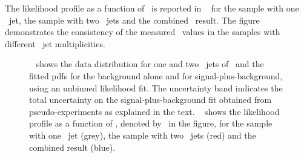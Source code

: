 The likelihood profile as a function of \mt\ is reported in \fig~ for the sample with one \btagged\ jet, the sample with two \btagged\ jets and the combined \ttbarll\ result.
%
The figure demonstrates the consistency of the measured \mt\ values in the samples with different \btagged\ jet multiplicities.
%
%
\begin{figure}[tbp!]
\centering
{}
%
\caption[Likelihood fit for $\sqrts=7$~\TeV\ data]{
%
\Fig~ shows the data distribution for one and two \btagged\ jets of \mlbr\ and the fitted \glspl{pdf} for the background alone and for signal-plus-background, using an unbinned likelihood fit. 
%
The uncertainty band indicates the total uncertainty on the signal-plus-background fit obtained from pseudo-experiments as explained in the text. 
%
\Fig~ shows the likelihood profile as a function of \mt, denoted by \mtdl\ in the figure, for the sample with one \btagged\ jet (grey), the sample with two \btagged\ jets (red) and the combined result (blue). 
%
\label{fig:results7TeV}}
\end{figure}
%


















